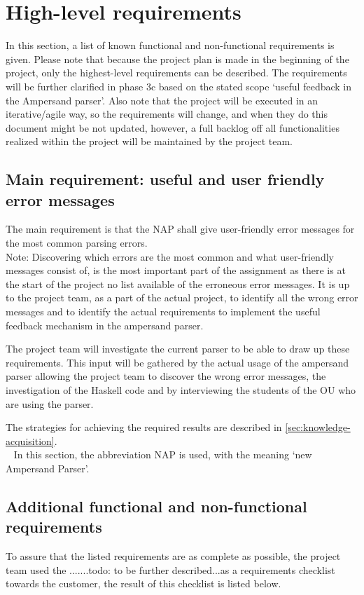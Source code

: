 \section{High-level requirements}
\label{sec:requirements}
In this section, a list of known functional and non-functional requirements is given.
Please note that because the project plan is made in the beginning of the project, only the highest-level requirements can be described.
The requirements will be further clarified in phase 3c based on the stated scope `useful feedback in the Ampersand parser'.
Also note that the project will be executed in an iterative/agile way, so the requirements will change, and when they do this document might be not updated, however, a full backlog off all functionalities realized within the project will be maintained by the project team.

\subsection{Main requirement: useful and user friendly error messages}
The main requirement is that the NAP shall give user-friendly error messages for the most common parsing errors.\\
Note: Discovering which errors are the most common and what user-friendly messages consist of, is the most important part of the assignment as there is at the start of the project no list available of the erroneous error messages.
It is up to the project team, as a part of the actual project, to identify all the wrong error messages and to identify the actual requirements to implement the useful feedback mechanism in the ampersand parser.

The project team will investigate the current parser to be able to draw up these requirements.
This input will be gathered by the actual usage of the ampersand parser allowing the project team to discover the wrong error messages, the investigation of the Haskell code and by interviewing the students of the OU who are using the parser.

The strategies for achieving the required results are described in \autoref{sec:knowledge-acquisition}.\\

~\newline\noindent
In this section, the abbreviation NAP is used, with the meaning `new Ampersand Parser'.
%

\subsection{Additional functional and non-functional requirements}
To assure that the listed requirements are as complete as possible, the project team used the .......todo: to be further described...as a requirements checklist towards the customer, the result of this checklist is listed below.

